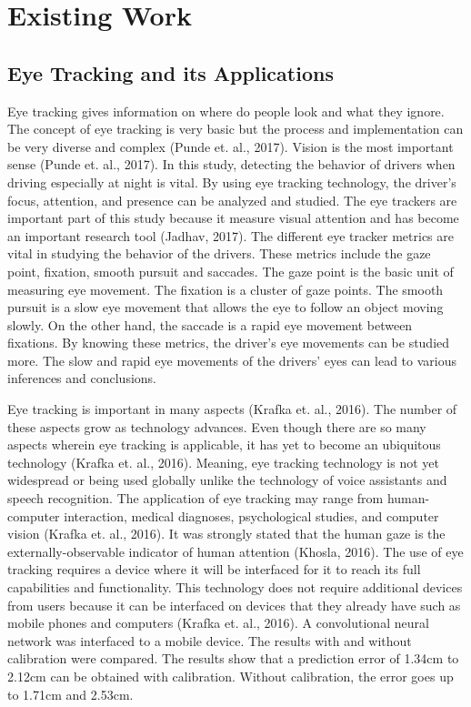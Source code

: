 \section{Existing Work}

\subsection{Eye Tracking and its Applications}
Eye tracking gives information on where do people look and what they ignore. The concept of eye tracking is very basic but the process and implementation can be very diverse and complex (Punde et. al., 2017). Vision is the most important sense (Punde et. al., 2017). In this study, detecting the behavior of drivers when driving especially at night is vital. By using eye tracking technology, the driver’s focus, attention, and presence can be analyzed and studied. The eye trackers are important part of this study because it measure visual attention and has become an important research tool (Jadhav, 2017). The different eye tracker metrics are vital in studying the behavior of the drivers. These metrics include the gaze point, fixation, smooth pursuit and saccades. The gaze point is the basic unit of measuring eye movement. The fixation is a cluster of gaze points. The smooth pursuit is a slow eye movement that allows the eye to follow an object moving slowly. On the other hand, the saccade is a rapid eye movement between fixations. By knowing these metrics, the driver’s eye movements can be studied more. The slow and rapid eye movements of the drivers’ eyes can lead to various inferences and conclusions.
\newline 

Eye tracking is important in many aspects (Krafka et. al., 2016). The number of these aspects grow as technology advances. Even though there are so many aspects wherein eye tracking is applicable, it has yet to become an ubiquitous technology (Krafka et. al., 2016). Meaning, eye tracking technology is not yet widespread or being used globally unlike the technology of voice assistants and speech recognition. The application of eye tracking may range from human-computer interaction, medical diagnoses, psychological studies, and computer vision (Krafka et. al., 2016). It was strongly stated that the human gaze is the externally-observable indicator of human attention (Khosla, 2016). The use of eye tracking requires a device where it will be interfaced for it to reach its full capabilities and functionality. This technology does not require additional devices from users because it can be interfaced on devices that they already have such as mobile phones and computers (Krafka et. al., 2016). A convolutional neural network was interfaced to a mobile device. The results with and without calibration were compared. The results show that a prediction error of 1.34cm to 2.12cm can be obtained with calibration. Without calibration, the error goes up to 1.71cm and 2.53cm.
\newline 

